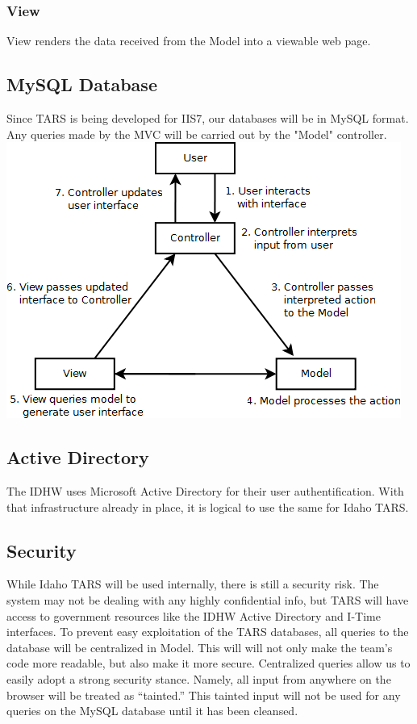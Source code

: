 \documentclass[letterpaper]{article}
\begin{document}
\subsubsection{View}
View renders the data received from the Model into a viewable web page.
\subsection{MySQL Database}
Since TARS is being developed for IIS7, our databases will be in MySQL format. Any queries made by the MVC will be carried out by the "Model" controller. \\
\includegraphics[scale=0.8]{../design/images/mvc.png}
\subsection{Active Directory}
The IDHW uses Microsoft Active Directory for their user authentification. With that infrastructure already in place, it is logical to use the same for Idaho TARS. 

\subsection{Security}
While Idaho TARS will be used internally, there is still a security risk. The system may not be dealing with any highly confidential info, but TARS will have access to government resources like the IDHW Active Directory and I-Time interfaces. To prevent easy exploitation of the TARS databases, all queries to the database will be centralized in Model. This will will not only make the team's code more readable, but also make it more secure. Centralized queries allow us to easily adopt a strong security stance. Namely, all input from anywhere on the browser will be treated as ``tainted.'' This tainted input will not be used for any queries on the MySQL database until it has been cleansed.
\end{document}
